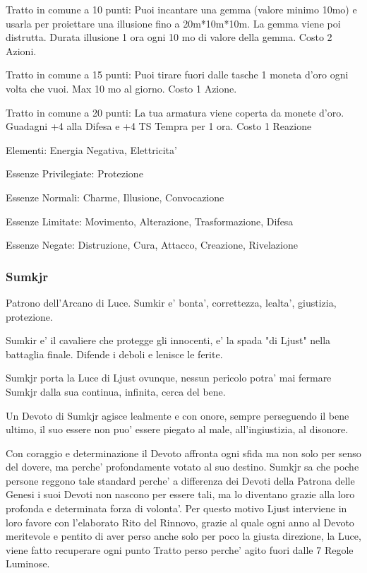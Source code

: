 \documentclass[a4paper,11pt,twoside,openany]{book}
\begin{document}
{Tratto in comune a 10 punti: Puoi incantare una gemma (valore minimo 10mo) e usarla per proiettare una illusione fino a 20m{*}10m{*}10m. La gemma viene poi distrutta. Durata illusione 1 ora ogni 10 mo di valore della gemma. Costo 2 Azioni.

Tratto in comune a 15 punti: Puoi tirare fuori dalle tasche 1 moneta d'oro ogni volta che vuoi. Max 10 mo al giorno. Costo 1 Azione.

Tratto in comune a 20 punti: La tua armatura viene coperta da monete d'oro. Guadagni +4 alla Difesa e +4 TS Tempra per 1 ora. Costo 1 Reazione 

\bigskip

Elementi: Energia Negativa, Elettricita'

\bigskip

Essenze Privilegiate: Protezione

Essenze Normali: Charme, Illusione, Convocazione

Essenze Limitate: Movimento, Alterazione, Trasformazione, Difesa

Essenze Negate: Distruzione, Cura, Attacco, Creazione, Rivelazione

\subsubsection{Sumkjr}

\label{sumkjr}

Patrono dell'Arcano di Luce. Sumkir e' bonta', correttezza, lealta', giustizia, protezione.

Sumkir e' il cavaliere che protegge gli innocenti, e' la spada "di Ljust" nella battaglia finale. Difende i deboli e lenisce le ferite.

Sumkjr porta la Luce di Ljust ovunque, nessun pericolo potra' mai fermare Sumkjr dalla sua continua, infinita, cerca del bene.

Un Devoto di Sumkjr agisce lealmente e con onore, sempre perseguendo il bene ultimo, il suo essere non puo' essere piegato al male, all'ingiustizia, al disonore.

Con coraggio e determinazione il Devoto affronta ogni sfida ma non solo per senso del dovere, ma perche' profondamente votato al suo destino. Sumkjr sa che poche persone reggono tale standard perche' a differenza dei Devoti della Patrona delle Genesi i suoi Devoti non nascono per essere tali, ma lo diventano grazie alla loro profonda e determinata forza di volonta'. Per questo motivo Ljust interviene in loro favore con l'elaborato Rito del Rinnovo, grazie al quale ogni anno al Devoto meritevole e pentito di aver perso anche solo per poco la giusta direzione, la Luce, viene fatto recuperare ogni punto Tratto perso perche' agito fuori dalle 7 Regole Luminose.

}
\end{document}
